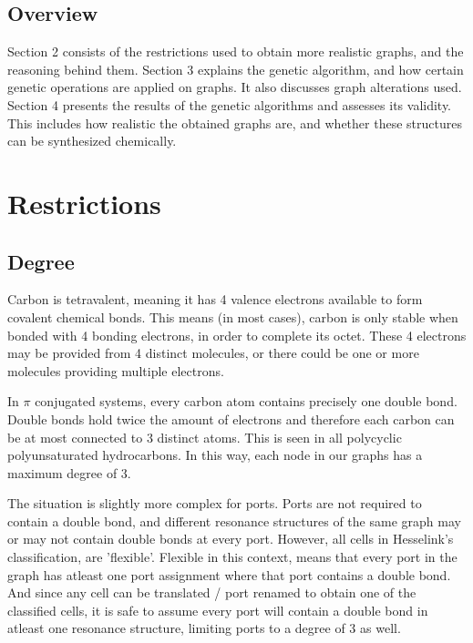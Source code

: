 \documentclass[12pt]{article}
\begin{document}
\subsection{Overview}

Section 2 consists of the restrictions used to obtain more realistic graphs, and the reasoning behind them. Section 3 explains the genetic algorithm, and how certain genetic operations are applied on graphs. It also discusses graph alterations used. Section 4 presents the results of the genetic algorithms and assesses its validity. This includes how realistic the obtained graphs are, and whether these structures can be synthesized chemically. %

\section{Restrictions}

\subsection{Degree}

Carbon is tetravalent, meaning it has 4 valence electrons available to form covalent chemical bonds. This means (in most cases), carbon is only stable when bonded with 4 bonding electrons, in order to complete its octet. These 4 electrons may be provided from 4 distinct molecules, or there could be one or more molecules providing multiple electrons.

In $\pi$ conjugated systems, every carbon atom contains precisely one double bond. Double bonds hold twice the amount of electrons and therefore each carbon can be at most connected to 3 distinct atoms. This is seen in all polycyclic polyunsaturated hydrocarbons. In this way, each node in our graphs has a maximum degree of 3. 

The situation is slightly more complex for ports. Ports are not required to contain a double bond, and different resonance structures of the same graph may or may not contain double bonds at every port. However, all cells in Hesselink's classification, are 'flexible'. Flexible in this context, means that every port in the graph has atleast one port assignment where that port contains a double bond. And since any cell can be translated / port renamed to obtain one of the classified cells, it is safe to assume every port will contain a double bond in atleast one resonance structure, limiting ports to a degree of 3 as well. 
\end{document}
